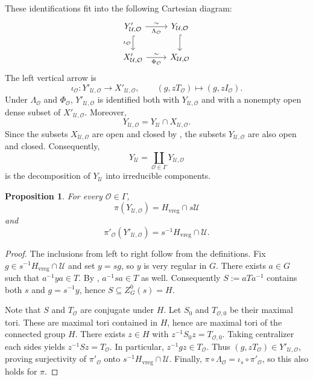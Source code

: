 \documentclass[11pt,letterpaper]{amsart}
\newtheorem{proposition}[theorem]{Proposition}
\theoremstyle{definition}
\numberwithin{equation}{section}
\numberwithin{theorem}{section}
\begin{document}
These identifications fit into the following Cartesian diagram:
\begin{equation}
\begin{tikzcd}
    Y'_{\mathcal{U},\mathcal{O}} \arrow[r,"\sim" sloped, "\Lambda_{\mathcal{O}}"'] \arrow[hookrightarrow, d, "\iota_{\mathcal O}"'] &
    Y_{\mathcal{U},\mathcal{O}} \arrow[hookrightarrow, d] \\
    X'_{\mathcal{U},\mathcal{O}} \arrow[r, "\sim" sloped, "\Phi_{\mathcal{O}}"'] &
    X_{\mathcal{U},\mathcal{O}}
\end{tikzcd}
\end{equation}
The left vertical arrow is
\begin{equation*}
\iota_{\mathcal O}:
Y'_{\mathcal U,\mathcal O}\longrightarrow
X'_{\mathcal U,\mathcal O},
\qquad(g,zT_{\mathcal O})\longmapsto
(g,zI_{\mathcal O}).
\end{equation*}
Under $\Lambda_{\mathcal O}$ and $\Phi_{\mathcal O}$,
$Y'_{\mathcal U,\mathcal O}$ is identified both with
$Y_{\mathcal U,\mathcal O}$ and with a nonempty open dense subset of
$X'_{\mathcal U,\mathcal O}$. Moreover,
\[
 Y_{\mathcal U,\mathcal O}
 =Y_{\mathcal U}\cap X_{\mathcal U,\mathcal O}.
\]
Since the subsets $X_{\mathcal U,\mathcal O}$ are open and closed by
, the subsets
$Y_{\mathcal U,\mathcal O}$ are
also open and closed. Consequently,
\begin{equation}\label{Ydec}
Y_{\mathcal U}
 =\coprod_{{\mathcal O}\in\Gamma}
   Y_{\mathcal U,{\mathcal O}}
\end{equation}
is the decomposition of $Y_{\mathcal U}$ into irreducible components.

\begin{proposition}
For every $\mathcal O\in\Gamma$,
\[
 \pi(Y_{\mathcal U,\mathcal O})
 =H_{\mathrm{vreg}}\cap s\mathcal U
\]
and
\[
 \pi'_{\mathcal O}(Y'_{\mathcal U,\mathcal O})
 =s^{-1}H_{\mathrm{vreg}}\cap\mathcal U.
\]
\end{proposition}
\begin{proof}
The inclusions from left to right follow from the definitions. Fix
$g\in s^{-1}H_{\mathrm{vreg}}\cap\mathcal U$ and set $y=sg$, so $y$ is very
regular in $G$. There exists $a\in G$ such that $a^{-1}ya\in T$. By ,
$a^{-1}sa\in T$ as well. Consequently
$S:=aTa^{-1}$ contains both $s$ and $g=s^{-1}y$, hence $S\subseteq Z_G^0(s)=H$.

Note that $S$ and $T_{\mathcal O}$ are conjugate under $H$.
Let $S_0$ and $T_{\mathcal O,0}$ be their maximal tori.
These are maximal tori contained in $H$, hence are maximal
tori of the connected group $H$. There exists $z\in H$ with
$z^{-1}S_0z=T_{\mathcal O,0}$. 
Taking centralizer each sides yields
$z^{-1}Sz=T_{\mathcal O}$. In particular, $z^{-1}gz\in T_{\mathcal O}$.
Thus $(g,zT_{\mathcal O})\in Y'_{\mathcal U,\mathcal O}$, proving
surjectivity of $\pi'_{\mathcal O}$ onto
$s^{-1}H_{\mathrm{vreg}}\cap\mathcal U$. Finally, $\pi\circ\Lambda_{\mathcal O}
=\iota_s\circ\pi'_{\mathcal O}$, so this also holds for $\pi$. 
\end{proof}
\end{document}
